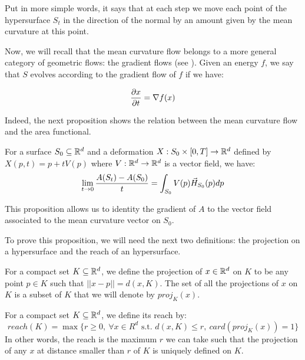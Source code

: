 Put in more simple words, it says that at each step we move each point of the
hypersurface $ S_t $ in the direction of the normal by an amount given by
the mean curvature at this point.

Now, we will recall that the mean curvature flow belongs to a more general
category of geometric flows: the gradient flows (see
\cite{ilmanen1998lectures}). Given an energy $ f $, we say that $ S $ evolves
according to the gradient flow of $ f $ if we have:

$$ \frac{\partial{x}}{\partial{t}} = \nabla f(x) $$

Indeed, the next proposition shows the relation between the mean curvature flow
and the area functional.

\begin{proposition}
    For a surface $ S_0 \subseteq \mathbb{R}^d $ and a deformation $ X : S_0 \times [0, T]
    \to \mathbb{R}^d $ defined by $ X(p, t) = p + t V(p) $ where $ V : \mathbb{R}^d \to \mathbb{R}^d $ is a
    vector field, we have:
    \begin{equation}
        \lim\limits_{t \to 0} \frac{A(S_t) - A(S_0)}{t} = \int_{S_0} V(p)
        \vec{H}_{S_0}(p) dp
    \end{equation}
    \label{prop:gradient-area-functional}
\end{proposition}

This proposition allows us to identity the gradient of $ A $ to the vector
field associated to the mean curvature vector on $ S_0 $.

To prove this proposition, we will need the next two definitions: the projection
on a hypersurface and the reach of an hypersurface.

\begin{definition}
    For a compact set $ K \subseteq \mathbb{R}^d $, we define the projection of $ x \in
    \mathbb{R}^d $ on $ K $ to be any point $ p \in K $ such that $ || x - p || = d(x,
    K) $.
    The set of all the projections of $ x $ on $ K $ is a subset of $ K $
    that we will denote by $ proj_K(x) $.
\end{definition}

\begin{definition}
    For a compact set $ K \subseteq \mathbb{R}^d $, we define its reach by:
    \begin{equation}
        reach(K) = \max \{ r \geq 0,~\forall x \in R^d \text{ s.t. } d(x, K) \leq
        r,~ card(proj_K(x)) = 1 \}
    \end{equation}
    In other words, the reach is the maximum $ r $ we can take such that the
    projection of any $ x  $ at distance smaller than $ r $ of $ K $ is uniquely
    defined on $ K $.
\end{definition}

